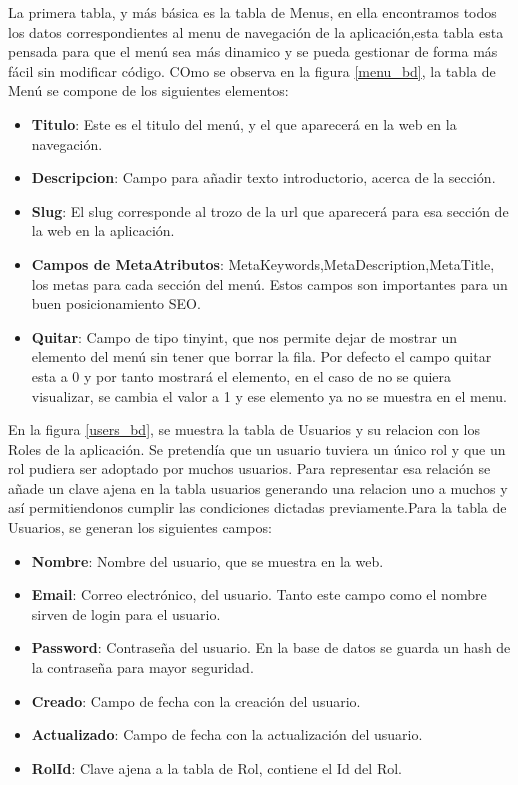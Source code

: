 \vspace{5 mm}

La primera tabla, y más básica es la tabla de Menus, en ella encontramos todos los datos correspondientes al menu de navegación de la aplicación,esta tabla esta pensada para que el menú sea más dinamico y se pueda gestionar de forma más fácil sin modificar código. COmo se observa en la figura \ref{menu_bd}, la tabla de Menú se compone de los siguientes elementos:

\begin{itemize}

\item \textbf{Titulo}: Este es el titulo del menú, y el que aparecerá en la web en la navegación.
\item \textbf{Descripcion}: Campo para añadir texto introductorio, acerca de la sección.
\item \textbf{Slug}: El slug corresponde al trozo de la url que aparecerá para esa sección de la web en la aplicación.
\item \textbf{Campos de MetaAtributos}: MetaKeywords,MetaDescription,MetaTitle, los metas para cada sección del menú. Estos campos son importantes para un buen posicionamiento SEO.
\item \textbf{Quitar}: Campo de tipo tinyint, que nos permite dejar de mostrar un elemento del menú sin tener que borrar la fila. Por defecto el campo quitar esta a 0 y por tanto mostrará el elemento, en el caso de no se quiera visualizar, se cambia el valor a 1 y ese elemento ya no se muestra en el menu.

\end{itemize}

\vspace{5 mm}

En la figura \ref{users_bd}, se muestra la tabla de Usuarios y su relacion con los Roles de la aplicación. Se pretendía que un usuario tuviera un único rol y que un rol pudiera ser adoptado por muchos usuarios. Para representar esa relación se añade un clave ajena en la tabla usuarios generando una relacion uno a muchos y así permitiendonos cumplir las condiciones dictadas previamente.Para la tabla de Usuarios, se generan los siguientes campos:

\begin{itemize}

\item \textbf{Nombre}: Nombre del usuario, que se muestra en la web.
\item \textbf{Email}: Correo electrónico, del usuario. Tanto este campo como el nombre sirven de login para el usuario.
\item \textbf{Password}: Contraseña del usuario. En la base de datos se guarda un hash de la contraseña para mayor seguridad.
\item \textbf{Creado}: Campo de fecha con la creación del usuario.
\item \textbf{Actualizado}: Campo de fecha con la actualización del usuario.
\item \textbf{RolId}: Clave ajena a la tabla de Rol, contiene el Id del Rol.

\end{itemize}

